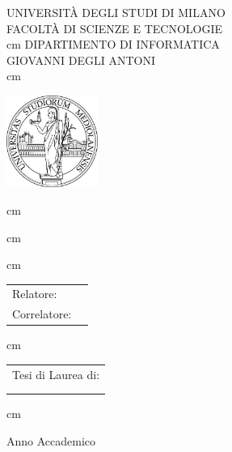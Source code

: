 \begin{titlingpage}

\begin{center}
	{\LARGE \uppercase{Università degli Studi di Milano}}\\
	\uppercase{Facoltà di Scienze e Tecnologie}\\
	 cm
	\uppercase{Dipartimento di Informatica\\Giovanni Degli Antoni}\\
	 cm
	\centerline{\includegraphics[height=30mm]{immagini/unimi}}
	 cm
	\Large\uppercase{\myCDL}

	\vfill
	 cm

	{\Large\uppercase\expandafter{\myTitle}}
\end{center}

\vfill
{} cm
		
\begin{tabular}{ll}
	{\large Relatore:} & \myRefereeA\\
	{\large Correlatore:} & \myRefereeB\\
\end{tabular}	

\vfill
{} cm

\begin{flushright}
	\begin{tabular}{l}
		{\large Tesi di Laurea di:}\\
		{\large \myName}\\
		{\large \myMat}\\
	\end{tabular}	
\end{flushright}
	
\vfill
{} cm

\begin{center}
	Anno Accademico \myYY
\end{center}

\end{titlingpage}